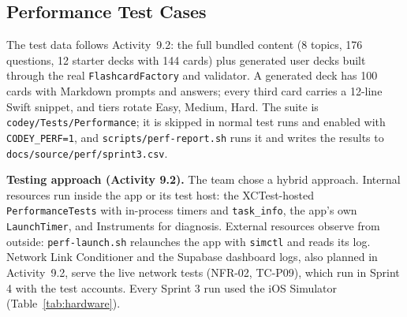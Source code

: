 \documentclass[12pt,letterpaper]{article}
\begin{document}
\subsection{Performance Test Cases}
The test data follows Activity~9.2: the full bundled content (8 topics, 176 questions,
12 starter decks with 144 cards) plus generated user decks built through the real
\texttt{FlashcardFactory} and validator. A generated deck has 100 cards with Markdown
prompts and answers; every third card carries a 12-line Swift snippet, and tiers
rotate Easy, Medium, Hard. The suite is \texttt{codey/Tests/Performance}; it is
skipped in normal test runs and enabled with \texttt{CODEY\_PERF=1}, and
\texttt{scripts/perf-report.sh} runs it and writes the results to
\texttt{docs/source/perf/sprint3.csv}.

\textbf{Testing approach (Activity 9.2).} The team chose a hybrid approach. Internal
resources run inside the app or its test host: the XCTest-hosted
\texttt{PerformanceTests} with in-process timers and \texttt{task\_info}, the app's
own \texttt{LaunchTimer}, and Instruments for diagnosis. External resources observe
from outside: \texttt{perf-launch.sh} relaunches the app with \texttt{simctl} and
reads its log. Network Link Conditioner and the Supabase dashboard logs, also planned
in Activity~9.2, serve the live network tests (NFR-02, TC-P09), which run in Sprint 4
with the test accounts. Every Sprint 3 run used the iOS Simulator
(Table~\ref{tab:hardware}).
\end{document}
